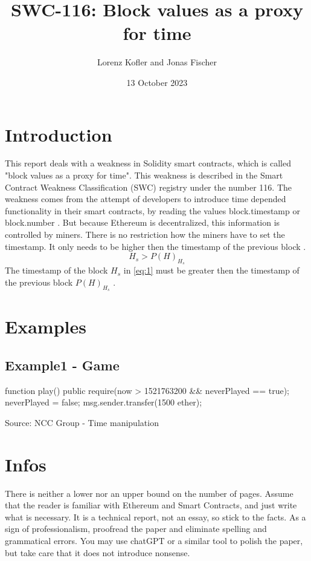 \documentclass{article}
\title{SWC-116: Block values as a proxy for time}
\author{Lorenz Kofler and Jonas Fischer}
\date{13 October 2023}
\begin{document}
\maketitle

\section{Introduction}
This report deals with a weakness in Solidity smart contracts, which is called "block values as a proxy for time".
This weakness is described in the Smart Contract Weakness Classification (SWC) registry under the number 116. \newline
The weakness comes from the attempt of developers to introduce time depended functionality in their smart contracts,
by reading the values block.timestamp or block.number \cite{swc116}. \newline
But because Ethereum is decentralized, this information is controlled by miners. There is no restriction how the miners have to set the timestamp.
It only needs to be higher then the timestamp of the previous block \cite{Conkas2021}.
\begin{equation} \label{eq:1}
H_s > P(H)_{H_s}
\end{equation}
The timestamp of the block $H_s$ in \ref{eq:1} must be greater then the timestamp of the previous block $P(H)_{H_s}$ \cite{ethyellowpaper2023}.

\section{Examples}
\subsection{Example1 - Game}
\begin{solidity}
    function play() public {
        require(now > 1521763200 && neverPlayed == true);
        neverPlayed = false;
        msg.sender.transfer(1500 ether);
    }
\end{solidity}
Source: NCC Group - Time manipulation \cite{DASP2018}

\section{Infos}
There is neither a lower nor an upper bound on the number of pages. Assume that
the reader is familiar with Ethereum and Smart Contracts, and just write what
is necessary. It is a technical report, not an essay, so stick to the facts. As
a sign of professionalism, proofread the paper and eliminate spelling and
grammatical errors. You may use chatGPT or a similar tool to polish the paper,
but take care that it does not introduce nonsense.
\end{document}
